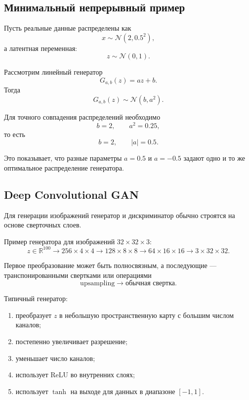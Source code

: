 \documentclass[12pt,a4paper]{article}
\newcommand{\R}{\mathbb{R}}
\numberwithin{equation}{section}
\theoremstyle{definition}
\theoremstyle{remark}
\begin{document}
\subsection{Минимальный непрерывный пример}

Пусть реальные данные распределены как
\[
    x\sim\mathcal{N}(2,0.5^2),
\]
а латентная переменная:
\[
    z\sim\mathcal{N}(0,1).
\]

Рассмотрим линейный генератор
\[
    G_{a,b}(z)=az+b.
\]
Тогда
\[
    G_{a,b}(z)\sim\mathcal{N}(b,a^2).
\]

Для точного совпадения распределений необходимо
\[
    b=2,
    \qquad
    a^2=0.25,
\]
то есть
\[
    b=2,
    \qquad
    |a|=0.5.
\]

Это показывает, что разные параметры \(a=0.5\) и \(a=-0.5\) задают
одно и то же оптимальное распределение генератора.

\subsection{Deep Convolutional GAN}

Для генерации изображений генератор и дискриминатор обычно строятся на
основе сверточных слоев.

Пример генератора для изображений \(32\times32\times3\):
\[
    z\in\R^{100}
    \longrightarrow
    256\times4\times4
    \longrightarrow
    128\times8\times8
    \longrightarrow
    64\times16\times16
    \longrightarrow
    3\times32\times32.
\]

Первое преобразование может быть полносвязным, а последующие ---
транспонированными свертками или операциями
\[
    \text{upsampling}\to\text{обычная свертка}.
\]

Типичный генератор:

\begin{enumerate}
    \item преобразует \(z\) в небольшую пространственную карту с
    большим числом каналов;
    \item постепенно увеличивает разрешение;
    \item уменьшает число каналов;
    \item использует ReLU во внутренних слоях;
    \item использует \(\tanh\) на выходе для данных в диапазоне
    \([-1,1]\).
\end{enumerate}
\end{document}
